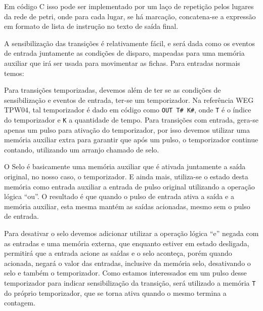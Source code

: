

Em código C isso pode ser implementado por um laço de repetição pelos lugares da rede de petri, onde para cada lugar, se há marcação, concatena-se a expressão em formato de lista de instrução no texto de saída final. 



A sensibilização das transições é relativamente fácil, e será dada como os eventos de entrada juntamente as condições de disparo, mapeadas para uma memória auxiliar que irá ser usada para movimentar as fichas. Para entradas normais temos:



Para transições temporizadas, devemos além de ter se as condições de sensibilização e eventos de entrada, ter-se um temporizador. Na referência WEG TPW04, tal temporizador é dado em código como \lstinline{OUT T# K#}, onde \lstinline{T} é o índice do temporizador e \lstinline{K} a quantidade de tempo. Para transições com entrada, gera-se apenas um pulso para ativação do temporizador, por isso devemos utilizar uma memória auxiliar extra para garantir que após um pulso, o temporizador continue contando, utilizando um arranjo chamado de selo.

O Selo é basicamente uma memória auxiliar que é ativada juntamente a saída original, no nosso caso, o temporizador. E ainda mais, utiliza-se o estado desta memória como entrada auxiliar a entrada de pulso original utilizando a operação lógica ``ou''. O resultado é que quando o pulso de entrada ativa a saída e a memória auxiliar, esta mesma mantém as saídas acionadas, mesmo sem o pulso de entrada.

Para desativar o selo devemos adicionar utilizar a operação lógica ``e'' negada com as entradas e uma memória externa, que enquanto estiver em estado desligada, permitirá que a entrada acione as saídas e o selo aconteça, porém quando acionada, negará o valor das entradas, inclusive da memória selo, desativando o selo e também o temporizador. Como estamos interessados em um pulso desse temporizador para indicar sensibilização da transição, será utilizado a memória \lstinline{T} do próprio temporizador, que se torna ativa quando o mesmo termina a contagem.

